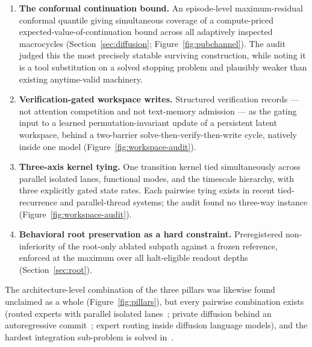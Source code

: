 \documentclass[10pt,a4paper]{article}
\begin{document}
\begin{enumerate}[label=\textbf{D\arabic*.},leftmargin=2.8em]
  spends, and shrinks the lane set when reservations are infeasible
  (Section~\ref{sec:graph}; Figure~\ref{fig:pubchannel}). CLSR's budget is the soft antecedent: an
  $L_1$ penalty pulling batch-average gate mass toward a target
  fraction~\cite{zhang2021clsr}. Soft regularization of average routing mass
  and hard per-block admission control are mechanically distinct.
\item \textbf{The conformal continuation bound.} An episode-level
  maximum-residual conformal quantile giving simultaneous coverage of a
  compute-priced expected-value-of-continuation bound across all adaptively
  inspected macrocycles (Section~\ref{sec:diffusion}; Figure~\ref{fig:pubchannel}). The audit judged this
  the most precisely statable surviving construction, while noting it is a
  tool substitution on a solved stopping problem and plausibly weaker than
  existing anytime-valid machinery.
\item \textbf{Verification-gated workspace writes.} Structured verification
  records --- not attention competition and not text-memory admission --- as
  the gating input to a learned permutation-invariant update of a persistent
  latent workspace, behind a two-barrier solve-then-verify-then-write cycle,
  natively inside one model (Figure~\ref{fig:workspace-audit}).
\item \textbf{Three-axis kernel tying.} One transition kernel tied
  simultaneously across parallel isolated lanes, functional modes, and the
  timescale hierarchy, with three explicitly gated state rates. Each
  pairwise tying exists in recent tied-recurrence and parallel-thread
  systems; the audit found no three-way instance
  (Figure~\ref{fig:workspace-audit}).
\item \textbf{Behavioral root preservation as a hard constraint.}
  Preregistered non-inferiority of the root-only ablated subpath against a
  frozen reference, enforced at the maximum over all halt-eligible readout
  depths (Section~\ref{sec:root}).
\end{enumerate}

The architecture-level combination of the three pillars was likewise found
unclaimed as a whole (Figure~\ref{fig:pillars}), but every pairwise
combination exists (routed experts
with parallel isolated lanes~\cite{mot2025}; private diffusion behind an
autoregressive commit~\cite{tidar2025}; expert routing inside diffusion
language models), and the hardest integration sub-problem is solved
in~\cite{tidar2025}.
\end{document}
